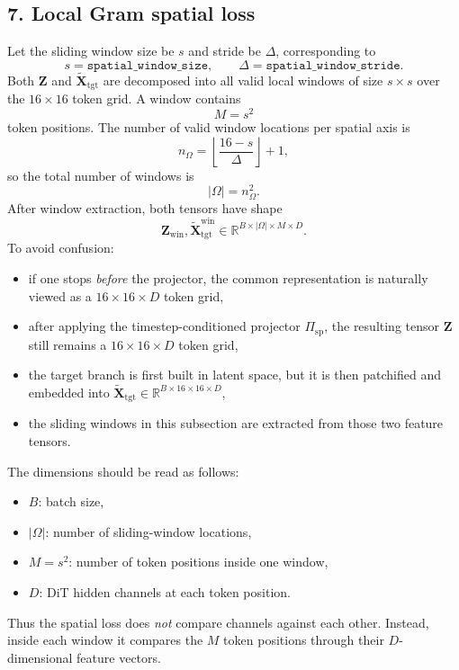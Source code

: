 \documentclass[11pt]{article}
\begin{document}
\subsection*{7. Local Gram spatial loss}
Let the sliding window size be $s$ and stride be $\Delta$, corresponding to
\[
  s = \texttt{spatial\_window\_size},
  \qquad
  \Delta = \texttt{spatial\_window\_stride}.
\]
Both $\bm{Z}$ and $\widetilde{\bm{X}}_{\mathrm{tgt}}$ are decomposed into all valid local windows of size $s\times s$ over the $16\times 16$ token grid. A window contains
\[
  M = s^2
\]
token positions. The number of valid window locations per spatial axis is
\[
  n_{\Omega}
  =
  \left\lfloor \frac{16-s}{\Delta}\right\rfloor + 1,
\]
so the total number of windows is
\[
  |\Omega| = n_{\Omega}^2.
\]
After window extraction, both tensors have shape
\[
  \bm{Z}_{\mathrm{win}},
  \widetilde{\bm{X}}^{\mathrm{win}}_{\mathrm{tgt}}
  \in
  \mathbb{R}^{B\times |\Omega|\times M\times D}.
\]
To avoid confusion:
\begin{itemize}
  \item if one stops \emph{before} the projector, the common representation is naturally viewed as a $16\times 16\times D$ token grid,
  \item after applying the timestep-conditioned projector $\Pi_{\mathrm{sp}}$, the resulting tensor $\bm{Z}$ still remains a $16\times 16\times D$ token grid,
  \item the target branch is first built in latent space, but it is then patchified and embedded into $\widetilde{\bm{X}}_{\mathrm{tgt}}\in\mathbb{R}^{B\times 16\times 16\times D}$,
  \item the sliding windows in this subsection are extracted from those two feature tensors.
\end{itemize}
The dimensions should be read as follows:
\begin{itemize}
  \item $B$: batch size,
  \item $|\Omega|$: number of sliding-window locations,
  \item $M=s^2$: number of token positions inside one window,
  \item $D$: DiT hidden channels at each token position.
\end{itemize}
Thus the spatial loss does \emph{not} compare channels against each other. Instead, inside each window it compares the $M$ token positions through their $D$-dimensional feature vectors.
\end{document}
